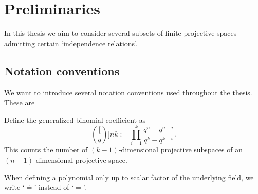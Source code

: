 \section{Preliminaries}

In this thesis we aim to consider several subsets of finite projective spaces admitting certain `independence relations'.

\subsection{Notation conventions}

We want to introduce several notation conventions used throughout the thesis.
These are 
\begin{definition}
    Define the generalized binomial coefficient as
    $$
    \binom[q]{n}{k}:= \prod_{i=1}^{k}{\frac{q^n-q^{n-i}}{q^k-q^{k-i}}}.
    $$
    This counts the number of $(k-1)$-dimensional projective subspaces of an $(n-1)$-dimensional projective space.
\end{definition}

When defining a polynomial only up to scalar factor of the underlying field, we write `$\doteq$' instead of `$=$'.


